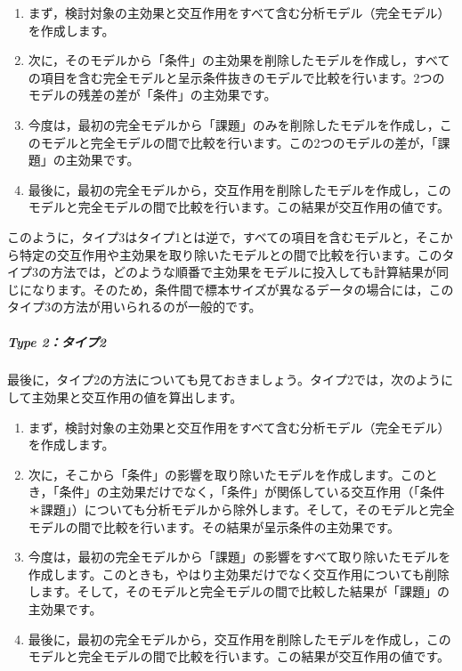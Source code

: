\documentclass[
  12pt,
  a5jpaper,
  lualatex, ja=standard]{bxjsbook}
\begin{document}
\begin{enumerate}
\def\labelenumi{\arabic{enumi}.}
\item
  まず，検討対象の主効果と交互作用をすべて含む分析モデル（完全モデル）を作成します。
\item
  次に，そのモデルから「条件」の主効果を削除したモデルを作成し，すべての項目を含む完全モデルと呈示条件抜きのモデルで比較を行います。2つのモデルの残差の差が「条件」の主効果です。
\item
  今度は，最初の完全モデルから「課題」のみを削除したモデルを作成し，このモデルと完全モデルの間で比較を行います。この2つのモデルの差が，「課題」の主効果です。
\item
  最後に，最初の完全モデルから，交互作用を削除したモデルを作成し，このモデルと完全モデルの間で比較を行います。この結果が交互作用の値です。
\end{enumerate}

このように，タイプ3はタイプ1とは逆で，すべての項目を含むモデルと，そこから特定の交互作用や主効果を取り除いたモデルとの間で比較を行います。このタイプ3の方法では，どのような順番で主効果をモデルに投入しても計算結果が同じになります。そのため，条件間で標本サイズが異なるデータの場合には，このタイプ3の方法が用いられるのが一般的です。

\hypertarget{type-2ux30bfux30a4ux30d72}{%
\subparagraph*{Type 2：タイプ2}\label{type-2ux30bfux30a4ux30d72}}

最後に，タイプ2の方法についても見ておきましょう。タイプ2では，次のようにして主効果と交互作用の値を算出します。

\begin{enumerate}
\def\labelenumi{\arabic{enumi}.}
\item
  まず，検討対象の主効果と交互作用をすべて含む分析モデル（完全モデル）を作成します。
\item
  次に，そこから「条件」の影響を取り除いたモデルを作成します。このとき，「条件」の主効果だけでなく，「条件」が関係している交互作用（「条件＊課題」）についても分析モデルから除外します。そして，そのモデルと完全モデルの間で比較を行います。その結果が呈示条件の主効果です。
\item
  今度は，最初の完全モデルから「課題」の影響をすべて取り除いたモデルを作成します。このときも，やはり主効果だけでなく交互作用についても削除します。そして，そのモデルと完全モデルの間で比較した結果が「課題」の主効果です。
\item
  最後に，最初の完全モデルから，交互作用を削除したモデルを作成し，このモデルと完全モデルの間で比較を行います。この結果が交互作用の値です。
\end{enumerate}
\end{document}
